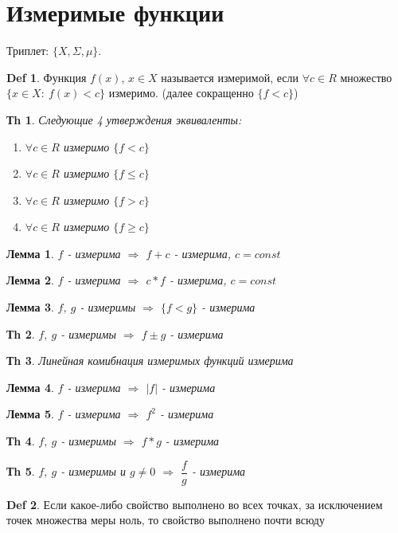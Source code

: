 \documentclass[14pt]{article}
\theoremstyle{plain}
\newtheorem{Thm}{Тh}
\newtheorem{Lem}{Лемма}
\theoremstyle{definition}
\newtheorem{Def}{Def}
\begin{document}
\section{Измеримые функции}
	Триплет: $\{X, \Sigma, \mu\}$. 
	\begin{Def}
		Функция $f(x)$, $x \in X$ называется измеримой, если $\forall c \in R$ множество $\{x \in X: \ f(x) < c \}$ измеримо. (далее сокращенно $\{f < c \}$)
	\end{Def}	
	\begin{Thm}
		Следующие 4 утверждения эквиваленты:
		\begin{enumerate}
			\item $\forall c \in R$ измеримо $\{ f < c\}$ 
			\item $\forall c \in R$ измеримо $\{ f \leq c\}$ 
			\item $\forall c \in R$ измеримо $\{ f > c\}$
			\item $\forall c \in R$ измеримо $\{ f \geq c\}$  
		\end{enumerate}
	\end{Thm}
	\begin{Lem}
		$f$ - измерима $\Rightarrow$ $f + c$ - измерима, $c = const$
	\end{Lem}
	\begin{Lem}
		$f$ - измерима $\Rightarrow$ $c*f$ - измерима, $c = const$
	\end{Lem}
	\begin{Lem}
		$f, \ g$ - измеримы $\Rightarrow$ $\{ f < g\}$ - измерима 
	\end{Lem}
	\begin{Thm}
		$f, \ g$ - измеримы $\Rightarrow$ $f \pm g$ - измерима		
	\end{Thm}
	\begin{Thm}
		Линейная комибнация измеримых функций измерима		
	\end{Thm}
	\begin{Lem}
		$f$ - измерима $\Rightarrow$ $|f|$ - измерима
	\end{Lem}
	\begin{Lem}
		$f$ - измерима $\Rightarrow$ $f^2$ - измерима
	\end{Lem}
	\begin{Thm}
		$f, \ g$ - измеримы $\Rightarrow$ $f*g$ - измерима
	\end{Thm}
	\begin{Thm}
		$f, \ g$ - измеримы и $g \neq 0$ $\Rightarrow$ $\dfrac{f}{g}$ - измерима
	\end{Thm}
	\begin{Def}
		Если какое-либо свойство выполнено во всех точках, за исключением точек множества меры ноль, то свойство выполнено почти всюду
	\end{Def}
\end{document}
